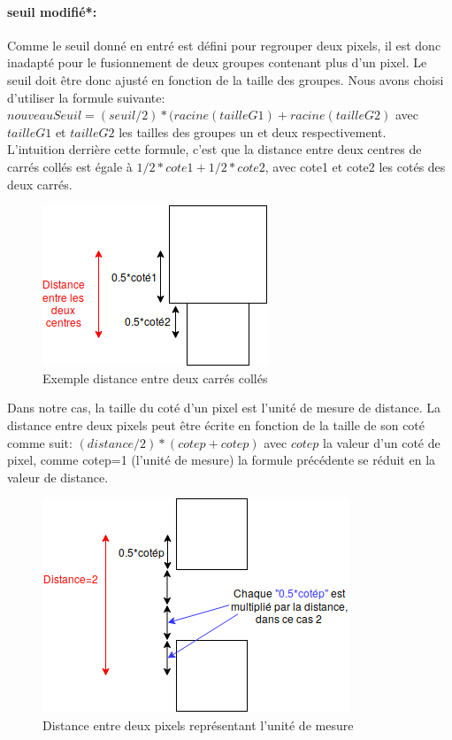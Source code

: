 \documentclass[12pt]{report}
\begin{document}
	\paragraph{seuil modifié*:}Comme le seuil donné en entré est défini pour regrouper deux pixels, il est donc inadapté pour le fusionnement de deux groupes contenant plus d’un pixel. Le seuil doit être donc ajusté en fonction de la taille des groupes. Nous avons choisi d’utiliser la formule suivante: \textbf{$nouveauSeuil = (seuil/2)*(racine(tailleG1)+racine(tailleG2)$} avec \textbf{$tailleG1$} et \textbf{$tailleG2$} les tailles des groupes un et deux respectivement.\\
	L’intuition derrière cette formule, c’est que la distance entre deux centres de carrés collés est égale à $1/2*cote1+1/2*cote2$, avec cote1 et cote2 les cotés des deux carrés.
	\begin{figure}[H]
		\centering
		\includegraphics[scale=0.75]{imgs/distanceSquares.png}
		\caption{Exemple distance entre deux carrés collés}
		\label{fig:DistanceSquares}
	\end{figure}
	Dans notre cas, la taille du coté d’un pixel est l’unité de mesure de distance. La distance entre deux pixels peut être écrite en fonction de la taille de son coté comme suit: \textbf{$(distance/2)*(cotep+cotep)$} avec \textbf{$cotep$} la valeur d’un coté de pixel, comme cotep=1 (l’unité de mesure) la formule précédente se réduit en la valeur de distance.
	\begin{figure}[H]
		\centering
		\includegraphics[scale=0.75]{imgs/distancePixels.png}
		\caption{Distance entre deux pixels représentant l'unité de mesure}
		\label{fig:DistancePixels}
	\end{figure}
\end{document}
